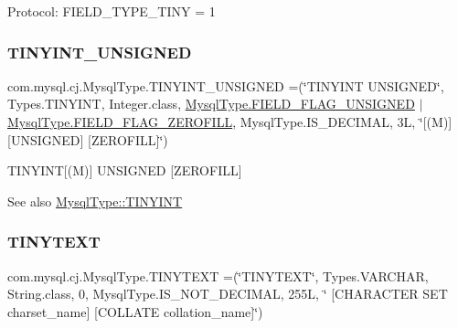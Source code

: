 Protocol\+: F\+I\+E\+L\+D\+\_\+\+T\+Y\+P\+E\+\_\+\+T\+I\+NY = 1 \mbox{\label{enumcom_1_1mysql_1_1cj_1_1_mysql_type_a1c7d8b3f1301ee4a89e044bb753725ba}} 
\subsubsection{\texorpdfstring{T\+I\+N\+Y\+I\+N\+T\+\_\+\+U\+N\+S\+I\+G\+N\+ED}{TINYINT\_UNSIGNED}}
{\footnotesize\ttfamily com.\+mysql.\+cj.\+Mysql\+Type.\+T\+I\+N\+Y\+I\+N\+T\+\_\+\+U\+N\+S\+I\+G\+N\+ED =(\char`\"{}T\+I\+N\+Y\+I\+NT U\+N\+S\+I\+G\+N\+ED\char`\"{}, Types.\+T\+I\+N\+Y\+I\+NT, Integer.\+class, \mbox{\hyperlink{enumcom_1_1mysql_1_1cj_1_1_mysql_type_a2c6701614559b1ad9955cdc4ca6337e2}{Mysql\+Type.\+F\+I\+E\+L\+D\+\_\+\+F\+L\+A\+G\+\_\+\+U\+N\+S\+I\+G\+N\+ED}} $\vert$ \mbox{\hyperlink{enumcom_1_1mysql_1_1cj_1_1_mysql_type_abb76a1f2f3dac9a30d1b559b8ba66a48}{Mysql\+Type.\+F\+I\+E\+L\+D\+\_\+\+F\+L\+A\+G\+\_\+\+Z\+E\+R\+O\+F\+I\+LL}}, Mysql\+Type.\+I\+S\+\_\+\+D\+E\+C\+I\+M\+AL, 3\+L, \char`\"{}\mbox{[}(\+M)\mbox{]} \mbox{[}\+U\+N\+S\+I\+G\+N\+E\+D\mbox{]} \mbox{[}\+Z\+E\+R\+O\+F\+I\+L\+L\mbox{]}\char`\"{})}

T\+I\+N\+Y\+I\+NT\mbox{[}(M)\mbox{]} U\+N\+S\+I\+G\+N\+ED \mbox{[}Z\+E\+R\+O\+F\+I\+LL\mbox{]}

\begin{DoxySeeAlso}{See also}
\mbox{\hyperlink{enumcom_1_1mysql_1_1cj_1_1_mysql_type_a87adada40b706dcea9427e4cf5294ed8}{Mysql\+Type\+::\+T\+I\+N\+Y\+I\+NT}} 
\end{DoxySeeAlso}
\mbox{\label{enumcom_1_1mysql_1_1cj_1_1_mysql_type_a86e06f00235ee92184960c872d76076f}} 
\subsubsection{\texorpdfstring{T\+I\+N\+Y\+T\+E\+XT}{TINYTEXT}}
{\footnotesize\ttfamily com.\+mysql.\+cj.\+Mysql\+Type.\+T\+I\+N\+Y\+T\+E\+XT =(\char`\"{}T\+I\+N\+Y\+T\+E\+XT\char`\"{}, Types.\+V\+A\+R\+C\+H\+AR, String.\+class, 0, Mysql\+Type.\+I\+S\+\_\+\+N\+O\+T\+\_\+\+D\+E\+C\+I\+M\+AL, 255\+L, \char`\"{} \mbox{[}\+C\+H\+A\+R\+A\+C\+T\+E\+R S\+E\+T charset\+\_\+name\mbox{]} \mbox{[}\+C\+O\+L\+L\+A\+T\+E collation\+\_\+name\mbox{]}\char`\"{})}

